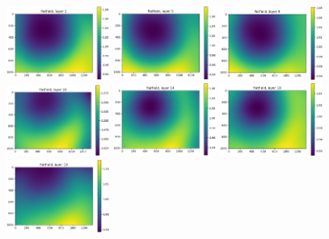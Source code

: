 \documentclass[letterpaper,11pt]{article}
\begin{document}
\begin{figure}[!ht]
\centering
\includegraphics[width=0.3\textwidth]{images/results/flatfield_layers/flatfield_layer_1}
\includegraphics[width=0.3\textwidth]{images/results/flatfield_layers/flatfield_layer_5}
\includegraphics[width=0.3\textwidth]{images/results/flatfield_layers/flatfield_layer_9}
\includegraphics[width=0.3\textwidth]{images/results/flatfield_layers/flatfield_layer_10}
\includegraphics[width=0.3\textwidth]{images/results/flatfield_layers/flatfield_layer_14}
\includegraphics[width=0.3\textwidth]{images/results/flatfield_layers/flatfield_layer_18}
\includegraphics[width=0.3\textwidth]{images/results/flatfield_layers/flatfield_layer_19}

\end{figure}
\end{document}
